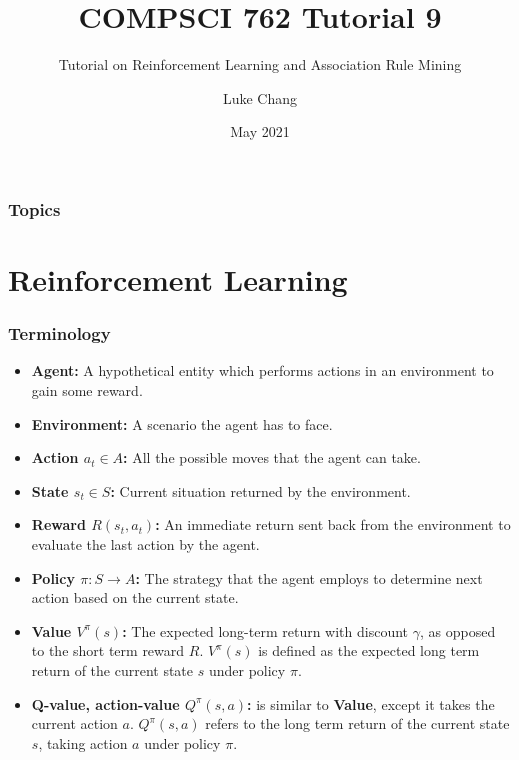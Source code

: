 \documentclass[aspectratio=169, 10pt]{beamer}
\title{COMPSCI 762 Tutorial 9}
\subtitle{Tutorial on Reinforcement Learning and Association Rule Mining}
\author{Luke Chang}
\institute{The University of Auckland}
\date{May 2021}
\begin{document}
\frame{\titlepage}

\begin{frame}
    \frametitle{Topics}

    \tableofcontents
        
\end{frame}

\section{Reinforcement Learning}
\begin{frame}[t]
\frametitle{Terminology}

\begin{itemize}
    \item \textbf{Agent:} A hypothetical entity which performs actions in an environment to gain some reward.
    \item \textbf{Environment:} A scenario the agent has to face.
    \item \textbf{Action $a_t \in A$:} All the possible moves that the agent can take.
    \item \textbf{State $s_t \in S$:} Current situation returned by the environment.
    \item \textbf{Reward $R(s_t, a_t)$:} An immediate return sent back from the environment to evaluate the last action by the agent.
    \item \textbf{Policy $\pi: S \to A$:} The strategy that the agent employs to determine next action based on the current state.
    \item \textbf{Value $V^\pi(s)$:} The expected long-term return with discount $\gamma$, as opposed to the short term reward $R$. 
        $V^\pi(s)$ is defined as the expected long term return of the current state $s$ under policy $\pi$.
    \item \textbf{Q-value, action-value $Q^\pi(s, a)$:} is similar to \textbf{Value}, except it takes the current action $a$.
        $Q^\pi(s, a)$ refers to the long term return of the current state $s$, taking action $a$ under policy $\pi$.
\end{itemize}


\end{frame}
\end{document}
